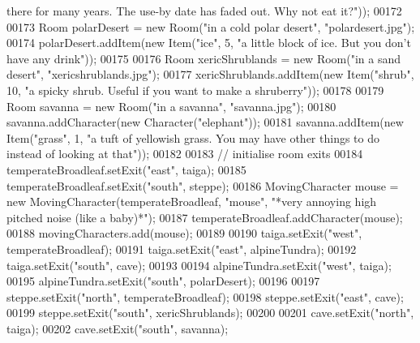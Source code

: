 \begin{DoxyCode}
{       there for many years. The use-by date has faded out. Why not eat it?"}));
00172 
00173         Room polarDesert = \textcolor{keyword}{new} Room(\textcolor{stringliteral}{"in a cold polar desert"}, \textcolor{stringliteral}{"polardesert.jpg"});
00174         polarDesert.addItem(\textcolor{keyword}{new} Item(\textcolor{stringliteral}{"ice"}, 5, \textcolor{stringliteral}{"a little block of ice. But you don't have any drink"}));
00175 
00176         Room xericShrublands = \textcolor{keyword}{new} Room(\textcolor{stringliteral}{"in a sand desert"}, \textcolor{stringliteral}{"xericshrublands.jpg"});
00177         xericShrublands.addItem(\textcolor{keyword}{new} Item(\textcolor{stringliteral}{"shrub"}, 10, \textcolor{stringliteral}{"a spicky shrub. Useful if you want to make a
       shruberry"}));
00178 
00179         Room savanna = \textcolor{keyword}{new} Room(\textcolor{stringliteral}{"in a savanna"}, \textcolor{stringliteral}{"savanna.jpg"});
00180         savanna.addCharacter(\textcolor{keyword}{new} Character(\textcolor{stringliteral}{"elephant"}));
00181         savanna.addItem(\textcolor{keyword}{new} Item(\textcolor{stringliteral}{"grass"}, 1, \textcolor{stringliteral}{"a tuft of yellowish grass. You may have other things to do
       instead of looking at that"}));
00182 
00183         \textcolor{comment}{// initialise room exits}
00184         temperateBroadleaf.setExit(\textcolor{stringliteral}{"east"}, taiga);
00185         temperateBroadleaf.setExit(\textcolor{stringliteral}{"south"}, steppe);
00186         MovingCharacter mouse = \textcolor{keyword}{new} MovingCharacter(temperateBroadleaf, \textcolor{stringliteral}{"mouse"}, \textcolor{stringliteral}{"*very annoying high
       pitched noise (like a baby)*"});
00187         temperateBroadleaf.addCharacter(mouse);
00188         movingCharacters.add(mouse);
00189 
00190         taiga.setExit(\textcolor{stringliteral}{"west"}, temperateBroadleaf);
00191         taiga.setExit(\textcolor{stringliteral}{"east"}, alpineTundra);
00192         taiga.setExit(\textcolor{stringliteral}{"south"}, cave);
00193 
00194         alpineTundra.setExit(\textcolor{stringliteral}{"west"}, taiga);
00195         alpineTundra.setExit(\textcolor{stringliteral}{"south"}, polarDesert);
00196 
00197         steppe.setExit(\textcolor{stringliteral}{"north"}, temperateBroadleaf);
00198         steppe.setExit(\textcolor{stringliteral}{"east"}, cave);
00199         steppe.setExit(\textcolor{stringliteral}{"south"}, xericShrublands);
00200 
00201         cave.setExit(\textcolor{stringliteral}{"north"}, taiga);
00202         cave.setExit(\textcolor{stringliteral}{"south"}, savanna);

\end{DoxyCode}
